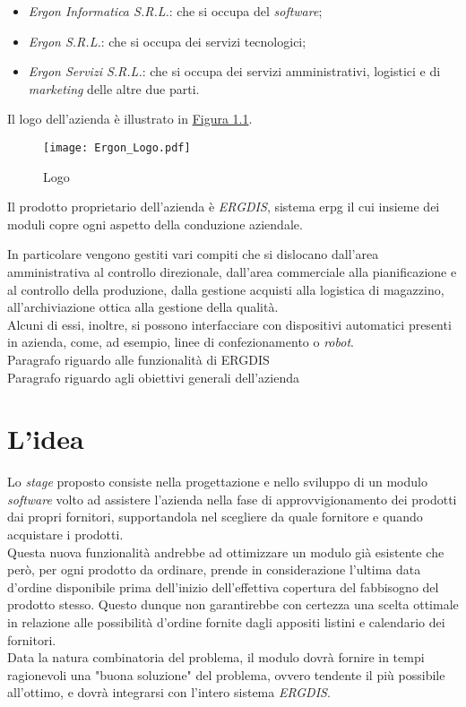 \begin{itemize}
    \item \textit{Ergon Informatica S.R.L.}: che si occupa del \textit{software};
    \item \textit{Ergon S.R.L.}: che si occupa dei servizi tecnologici;
    \item \textit{Ergon Servizi S.R.L.}: che si occupa dei servizi amministrativi, logistici e di \textit{marketing} delle altre due parti.
\end{itemize}
Il logo dell'azienda è illustrato in \hyperref[fig:logo]{Figura 1.1}.
\begin{figure}[!h]
    \centering
    \texttt{[image: Ergon\_Logo.pdf]}
    \caption{Logo \myCompany}
    \label{fig:logo}
\end{figure}
\newline
\noindent Il prodotto proprietario dell'azienda è \textit{ERGDIS}, sistema \gls{erpg}
il cui insieme dei moduli copre ogni aspetto della conduzione aziendale.\newline

\noindent In particolare vengono gestiti vari compiti che si dislocano dall'area amministrativa al controllo direzionale,
dall'area commerciale alla pianificazione e al controllo della produzione, dalla gestione acquisti alla logistica di magazzino, 
all'archiviazione ottica alla gestione della qualità.\\
Alcuni di essi, inoltre, si possono interfacciare con dispositivi automatici presenti in azienda, come, ad esempio,
linee di confezionamento o \textit{robot}.\\

Paragrafo riguardo alle funzionalità di ERGDIS\\

Paragrafo riguardo agli obiettivi generali dell'azienda
 

\section{L'idea}
\noindent Lo \textit{stage} proposto consiste nella progettazione e nello sviluppo di un modulo \textit{software} volto
ad assistere l'azienda nella fase di approvvigionamento dei prodotti dai propri fornitori, supportandola nel scegliere
da quale fornitore e quando acquistare i prodotti.\\

\noindent Questa nuova funzionalità andrebbe ad ottimizzare un modulo già esistente che però, per ogni prodotto da ordinare, prende in
considerazione l'ultima data d'ordine disponibile prima dell'inizio
dell'effettiva copertura del fabbisogno del prodotto stesso. Questo dunque non garantirebbe con certezza una scelta ottimale
in relazione alle possibilità d'ordine fornite dagli appositi listini e calendario dei fornitori.\\
Data la natura combinatoria del problema, il modulo dovrà fornire in tempi ragionevoli una "buona soluzione"
del problema, ovvero tendente il più possibile all'ottimo, e dovrà integrarsi con l'intero sistema \textit{ERGDIS}.\\

